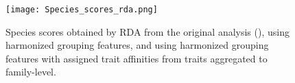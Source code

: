 \documentclass[../Draft_harmonization_paper.tex]{subfiles}
\begin{document}

\begin{figure}[H]
    \label{fig:rda_species_scores}
    \centering
    \texttt{[image: Species\_scores\_rda.png]}
    \caption{Species scores obtained by RDA from the original analysis (\cite{szocs_effects_2014}), using harmonized grouping features, and using harmonized grouping features with assigned trait affinities from traits aggregated to family-level.}
    \label{fig:rda_species_scores}
\end{figure}
\end{document}
